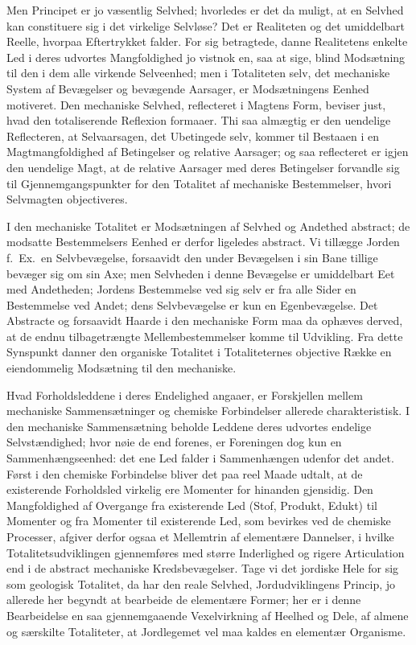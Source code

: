 \documentclass[12pt]{book}
\newcommand{\opage}[1]{\marginnote{\footnotesize\textit{[#1]}}}
\begin{document}
Men Principet er jo væsentlig Selvhed; hvorledes er det da muligt, at en Selvhed kan
constituere sig i det virkelige Selvløse? Det er Realiteten og det umiddelbart Reelle,
\opage{130} hvorpaa Eftertrykket falder. For sig betragtede, danne Realitetens enkelte Led i deres
udvortes Mangfoldighed jo vistnok en, saa at sige, blind Modsætning til den i dem alle
virkende Selveenhed; men i Totaliteten selv, det mechaniske System af Bevægelser og
bevægende Aarsager, er Modsætningens Eenhed motiveret. Den mechaniske Selvhed,
reflecteret i Magtens Form, beviser just, hvad den totaliserende Reflexion formaaer. Thi
saa almægtig er den uendelige Reflecteren, at Selvaarsagen, det Ubetingede selv, kommer
til Bestaaen i en Magtmangfoldighed af Betingelser og relative Aarsager; og saa
reflecteret er igjen den uendelige Magt, at de relative Aarsager med deres Betingelser
forvandle sig til Gjennemgangspunkter for den Totalitet af mechaniske Bestemmelser, hvori
Selvmagten objectiveres.

I den mechaniske Totalitet er Modsætningen af Selvhed og Andethed abstract; de modsatte
Bestemmelsers Eenhed er derfor ligeledes abstract. Vi tillægge Jorden f.\ Ex.\ en
Selvbevægelse, forsaavidt den under Bevægelsen i sin Bane tillige bevæger sig om sin Axe;
men Selvheden i denne Bevægelse er umiddelbart Eet med Andetheden; Jordens Bestemmelse ved
sig selv er fra alle Sider en Bestemmelse ved Andet; dens Selvbevægelse er kun en
Egenbevægelse. Det Abstracte og forsaavidt Haarde i den mechaniske Form maa da ophæves
derved, at de endnu tilbagetrængte Mellembestemmelser komme til Udvikling. Fra dette
Synspunkt danner den organiske Totalitet i Totaliteternes objective Række en eiendommelig
Modsætning til den mechaniske.

Hvad Forholdsleddene i deres Endelighed angaaer, er Forskjellen mellem mechaniske
Sammensætninger og chemiske Forbindelser allerede charakteristisk. I den mechaniske
Sammensætning beholde Leddene deres udvortes endelige Selvstændighed; hvor nøie de end
forenes, er Foreningen dog kun en Sammenhængseenhed: det ene Led falder i Sammenhængen
\opage{131} udenfor det andet. Først i den chemiske Forbindelse bliver det paa reel Maade udtalt, at
de existerende Forholdsled virkelig ere Momenter for hinanden gjensidig. Den
Mangfoldighed af Overgange fra existerende Led (Stof, Produkt, Edukt) til Momenter og fra
Momenter til existerende Led, som bevirkes ved de chemiske Processer, afgiver derfor ogsaa
et Mellemtrin af elementære Dannelser, i hvilke Totalitetsudviklingen gjennemføres med
større Inderlighed og rigere Articulation end i de abstract mechaniske Kredsbevægelser.
Tage vi det jordiske Hele for sig som geologisk Totalitet, da har den reale Selvhed,
Jordudviklingens Princip, jo allerede her begyndt at bearbeide de elementære Former; her
er i denne Bearbeidelse en saa gjennemgaaende Vexelvirkning af Heelhed og Dele, af almene
og særskilte Totaliteter, at Jordlegemet vel maa kaldes en elementær Organisme.
\end{document}
